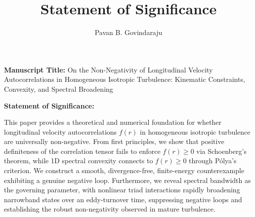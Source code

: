 \documentclass[11pt]{article}
\title{\textbf{Statement of Significance}}
\author{Pavan B. Govindaraju}
\date{}
\begin{document}
\maketitle
\thispagestyle{empty}

\noindent\textbf{Manuscript Title:} On the Non-Negativity of Longitudinal Velocity Autocorrelations in Homogeneous Isotropic Turbulence: Kinematic Constraints, Convexity, and Spectral Broadening

\vspace{1.5em}

\noindent\textbf{Statement of Significance:}

\vspace{0.5em}
\noindent
This paper provides a theoretical and numerical foundation for whether longitudinal velocity autocorrelations $f(r)$ in homogeneous isotropic turbulence are universally non-negative. From first principles, we show that positive definiteness of the correlation tensor fails to enforce $f(r) \ge 0$ via Schoenberg's theorem, while 1D spectral convexity connects to $f(r) \ge 0$ through P\'olya's criterion. We construct a smooth, divergence-free, finite-energy counterexample exhibiting a genuine negative loop. Furthermore, we reveal spectral bandwidth as the governing parameter, with nonlinear triad interactions rapidly broadening narrowband states over an eddy-turnover time, suppressing negative loops and establishing the robust non-negativity observed in mature turbulence.
\end{document}
